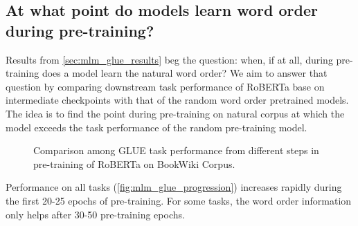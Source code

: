 \documentclass[letterpaper, 12pt]{report}
\begin{document}
\subsection{At what point do models learn word order during pre-training?}

Results from \autoref{sec:mlm_glue_results} beg the question: when, if at all, during pre-training does a model learn the natural word order? We aim to answer that question by comparing downstream task performance of RoBERTa base on intermediate checkpoints with that of the random word order pretrained models. The idea is to find the point during pre-training on natural corpus at which the model exceeds the task performance of the random pre-training model.


\begin{figure}[t]
    \centering
    \caption{Comparison among GLUE task performance from different steps in pre-training of RoBERTa on BookWiki Corpus.}
    \label{fig:mlm_glue_progression}
\end{figure}

Performance on all tasks (\autoref{fig:mlm_glue_progression}) increases rapidly during the first 20-25 epochs of pre-training. For some tasks, the word order information only helps after 30-50 pre-training epochs.
\end{document}
